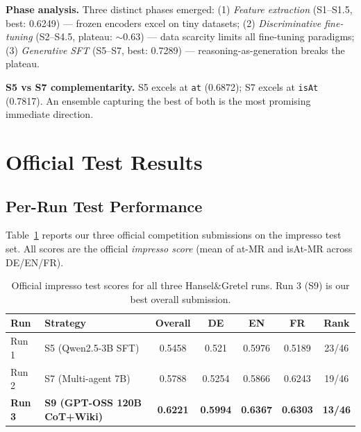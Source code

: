 \documentclass{ceurart}
\begin{document}
\textbf{Phase analysis.} Three distinct phases emerged: (1) \emph{Feature extraction} (S1--S1.5, best: 0.6249) --- frozen encoders excel on tiny datasets; (2) \emph{Discriminative fine-tuning} (S2--S4.5, plateau: $\sim$0.63) --- data scarcity limits all fine-tuning paradigms; (3) \emph{Generative SFT} (S5--S7, best: 0.7289) --- reasoning-as-generation breaks the plateau.

\textbf{S5 vs S7 complementarity.} S5 excels at \texttt{at} (0.6872); S7 excels at \texttt{isAt} (0.7817). An ensemble capturing the best of both is the most promising immediate direction.

\section{Official Test Results}
\label{sec:official}

\subsection{Per-Run Test Performance}

Table~\ref{tab:official-runs} reports our three official competition submissions on the impresso test set. All scores are the official \textit{impresso score} (mean of at-MR and isAt-MR across DE/EN/FR).

\begin{table}[ht]
  \caption{Official impresso test scores for all three Hansel\&Gretel runs. Run 3 (S9) is our best overall submission.}
  \label{tab:official-runs}
  \centering
  \begin{tabular}{llccccc}
    \toprule
    \textbf{Run} & \textbf{Strategy} & \textbf{Overall} & \textbf{DE} & \textbf{EN} & \textbf{FR} & \textbf{Rank} \\
    \midrule
    Run 1 & S5 (Qwen2.5-3B SFT) & 0.5458 & 0.521 & 0.5976 & 0.5189 & 23/46 \\
    Run 2 & S7 (Multi-agent 7B) & 0.5788 & 0.5254 & 0.5866 & 0.6243 & 19/46 \\
    \textbf{Run 3} & \textbf{S9 (GPT-OSS 120B CoT+Wiki)} & \textbf{0.6221} & \textbf{0.5994} & \textbf{0.6367} & \textbf{0.6303} & \textbf{13/46} \\
    \bottomrule
  \end{tabular}
\end{table}
\end{document}
